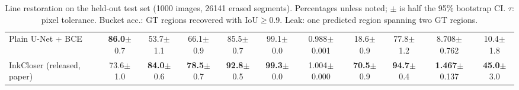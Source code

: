 \begin{table}[t]
{\begin{tabular}{lcccccccccc}
Plain U-Net + BCE & \textbf{86.0}{\scriptsize$\pm$0.7} & 53.7{\scriptsize$\pm$1.1} & 66.1{\scriptsize$\pm$0.9} & 85.5{\scriptsize$\pm$0.7} & 99.1{\scriptsize$\pm$0.0} & 0.988{\scriptsize$\pm$0.001} & 18.6{\scriptsize$\pm$0.9} & 77.8{\scriptsize$\pm$1.2} & 8.708{\scriptsize$\pm$0.762} & 10.4{\scriptsize$\pm$1.8} \\
InkCloser (released, paper) & 73.6{\scriptsize$\pm$1.0} & \textbf{84.0}{\scriptsize$\pm$0.6} & \textbf{78.5}{\scriptsize$\pm$0.7} & \textbf{92.8}{\scriptsize$\pm$0.5} & \textbf{99.3}{\scriptsize$\pm$0.0} & 1.004{\scriptsize$\pm$0.000} & \textbf{70.5}{\scriptsize$\pm$0.9} & \textbf{94.7}{\scriptsize$\pm$0.4} & \textbf{1.467}{\scriptsize$\pm$0.137} & \textbf{45.0}{\scriptsize$\pm$3.0} \\
\bottomrule
\end{tabular}}
\caption{Line restoration on the held-out test set (1000 images, 26141 erased segments). Percentages unless noted; $\pm$ is half the 95\% bootstrap CI. $\tau$: pixel tolerance. Bucket acc.: GT regions recovered with IoU$\geq$0.9. Leak: one predicted region spanning two GT regions.}
\label{tab:main_results}
\end{table}